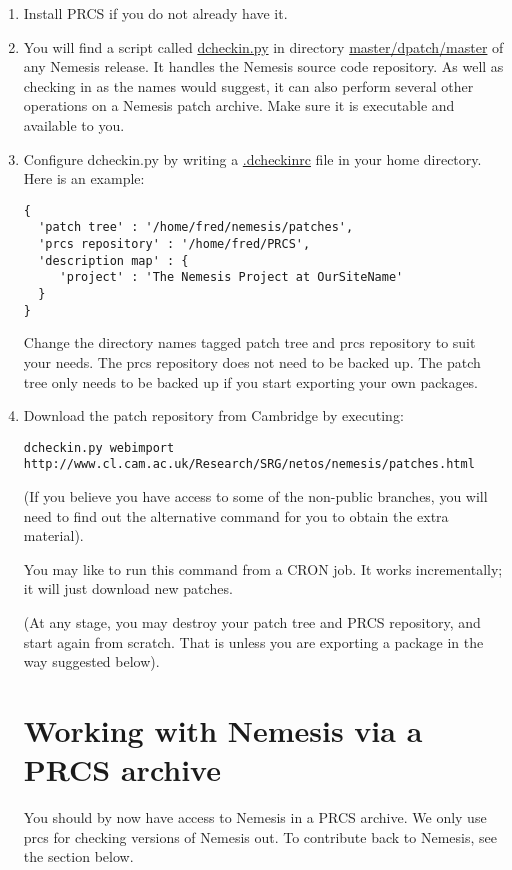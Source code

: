 \documentclass[a4paper]{article}
\newcommand{\file}[1]{\url{#1}}
\newcommand{\dir}[1]{\url{#1}}
\newcommand{\script}[1]{\url{#1}}
\begin{document}
\begin{enumerate}
\item Install PRCS if you do not already have it.
\item You will find a script called \script{dcheckin.py} in directory \dir{master/dpatch/master} of
any Nemesis release. It handles the Nemesis source code
repository. As well as checking in as the names would suggest, it can
also perform several other operations on a Nemesis patch archive. Make sure it is executable and available to you.
\item Configure dcheckin.py by writing a \file{.dcheckinrc} file in your home
directory. Here is an example:

\begin{verbatim}
{
  'patch tree' : '/home/fred/nemesis/patches',
  'prcs repository' : '/home/fred/PRCS',
  'description map' : {
     'project' : 'The Nemesis Project at OurSiteName'
  }
}
\end{verbatim}

Change the directory names tagged patch tree and prcs repository to
suit your needs. The prcs repository does not need to be backed
up. The patch tree only needs to be backed up if you start exporting
your own packages.

\item Download the patch repository from Cambridge by executing:

{\small
\begin{verbatim}
dcheckin.py webimport http://www.cl.cam.ac.uk/Research/SRG/netos/nemesis/patches.html
\end{verbatim}}

(If you believe you have access to some of the non-public branches,
you will need to find out the alternative command for you to obtain
the extra material).

You may like to run this command from a CRON job. It works
incrementally; it will just download new patches.

(At any stage, you may destroy your patch tree and PRCS
repository, and start again from scratch. That is unless you are
exporting a package in the way suggested below).


\section{Working with Nemesis via a PRCS archive}

You should by now have access to Nemesis in a PRCS archive. We only
use prcs for checking versions of Nemesis out. To contribute back to
Nemesis, see the section below. 


\end{enumerate}
\end{document}

